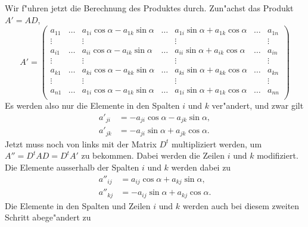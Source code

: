 Wir f"uhren jetzt die Berechnung des Produktes durch.
Zun"achst das Produkt $A'=AD$,
\[
A'
=
\begin{pmatrix}
a_{11}&\dots &a_{1i}\cos\alpha - a_{1k}\sin\alpha
		&\dots  & a_{1i}\sin\alpha+a_{1k}\cos\alpha
				&\dots	&a_{1n}\\
\vdots&      &\vdots
		&	&\vdots
				&	&\vdots\\
a_{i1}&\dots &a_{ii}\cos\alpha - a_{ik}\sin\alpha
		&\dots  & a_{ii}\sin\alpha+a_{ik}\cos\alpha
				&\dots	&a_{in}\\
\vdots&      &\vdots
		&	&\vdots
				&	&\vdots\\
a_{k1}&\dots &a_{ki}\cos\alpha - a_{kk}\sin\alpha
		&\dots  & a_{ki}\sin\alpha+a_{kk}\cos\alpha
				&\dots	&a_{kn}\\
\vdots&      &\vdots
		&	&\vdots
				&	&\vdots\\
a_{n1}&\dots &a_{1i}\cos\alpha - a_{1k}\sin\alpha
		&\dots  & a_{1i}\sin\alpha+a_{1k}\cos\alpha
				&\dots	&a_{nn}\\
\end{pmatrix}
\]
Es werden also nur die Elemente in den Spalten $i$ und $k$
ver"andert, und zwar gilt
\begin{equation}
\begin{aligned}
a'_{ji}&=-a_{ji}\cos\alpha-a_{jk}\sin\alpha,\\
a'_{jk}&=-a_{ji}\sin\alpha+a_{jk}\cos\alpha.
\end{aligned}
\label{dtad1}
\end{equation}
Jetzt muss noch von links mit der Matrix $D^t$
multipliziert werden, um $A''=D^tAD=D^tA'$ zu bekommen.
Dabei werden die Zeilen $i$ und $k$ modifiziert.
Die Elemente ausserhalb der Spalten $i$ und $k$ werden 
dabei zu
\begin{equation}
\begin{aligned}
a''_{ij}&=a_{ij}\cos\alpha+a_{kj}\sin\alpha,\\
a''_{kj}&=-a_{ij}\sin\alpha+a_{kj}\cos\alpha.
\end{aligned}
\label{dtad2}
\end{equation}
Die Elemente in den Spalten und Zeilen $i$ und $k$ werden
auch bei diesem zweiten Schritt abege"andert zu
